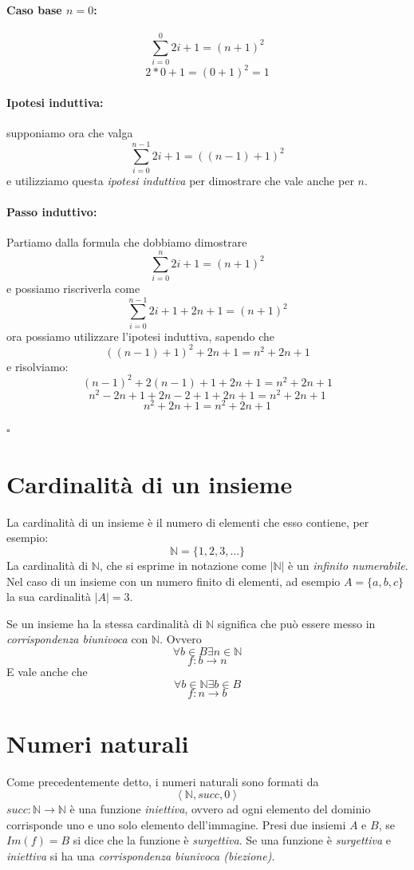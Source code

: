 \documentclass[a4paper,12pt]{report}
\begin{document}
\paragraph{Caso base $n=0$:}
\[ \sum_{i=0}^{0} 2i+1 = (n+1)^2 \]
\[ 2*0+1 = (0 + 1)^2 = 1 \]

\paragraph{Ipotesi induttiva:} supponiamo ora che valga 
\[ \sum_{i=0}^{n-1} 2i+1 = ((n-1)+1)^2 \]
e utilizziamo questa \emph{ipotesi induttiva} per dimostrare che vale anche per $n$.

\paragraph{Passo induttivo:}

Partiamo dalla formula che dobbiamo dimostrare 
\[ \sum_{i=0}^{n}2i+1 = (n+1)^2 \]
e possiamo riscriverla come
\[ \sum_{i=0}^{n-1} 2i+1 + 2n+1 = (n+1)^2 \]
ora possiamo utilizzare l'ipotesi induttiva, sapendo che 
\[ ((n-1)+1)^2 + 2n+1 = n^2 + 2n + 1 \]
e risolviamo:
\[ (n-1)^2 + 2(n-1) + 1 + 2n + 1 = n^2+2n+1 \] 
\[ n^2-2n+1+2n-2+1+2n+1 = n^2+2n+1 \]
\[ n^2+2n+1 = n^2+2n+1 \]
\begin{flushright}{$\square$}\end{flushright}


\section{Cardinalit\`{a} di un insieme}
La cardinalit\`{a} di un insieme \`{e} il numero di elementi che esso contiene, per esempio:
\[ \mathbb{N} = \{ 1, 2, 3, \dots \} \]
La cardinalit\`{a} di $\mathbb{N}$, che si esprime in notazione come $|\mathbb{N}|$ \`{e} un \emph{infinito numerabile}.
Nel caso di un insieme con un numero finito di elementi, ad esempio $A = \{a, b, c \}$ la sua cardinalit\`{a} $|A| = 3$.

Se un insieme ha la stessa cardinalit\`{a} di $\mathbb{N}$ significa che pu\`{o} essere messo in \emph{corrispondenza biunivoca} con $\mathbb{N}$.
Ovvero 
\[ \forall b\in B \exists n \in \mathbb{N} \]
\[ f: b \rightarrow n \]
E vale anche che
\[ \forall b \in \mathbb{N} \exists b \in B \]
\[ f: n \rightarrow b \]

\section{Numeri naturali}
Come precedentemente detto, i numeri naturali sono formati da
\[ \left<\mathbb{N}, succ, 0\right> \]
$succ: \mathbb{N} \rightarrow \mathbb{N}$ \`{e} una funzione \emph{iniettiva}, ovvero ad ogni elemento del dominio corrisponde uno e uno solo elemento dell'immagine. 
Presi due insiemi $A$ e $B$, se $Im(f) = B$ si dice che la funzione \`{e} \emph{surgettiva}. 
Se una funzione \`{e} \emph{surgettiva} e \emph{iniettiva} si ha una \emph{corrispondenza biunivoca (biezione)}.
\end{document}
